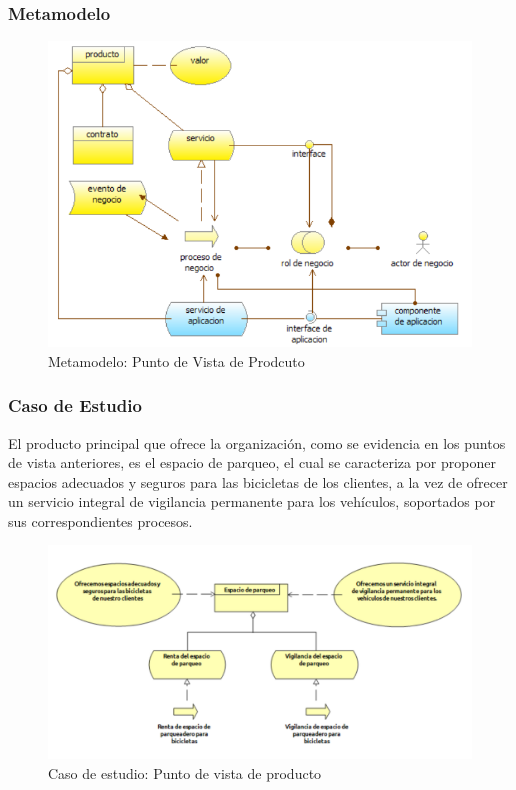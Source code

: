 \subsubsection{Metamodelo}
\begin{figure}[H]
	\centering
	\includegraphics[width=1.0\textwidth]{imagenes/Metamodelos/Negocio/meta_producto.png}
	\caption{Metamodelo: Punto de Vista de Prodcuto}
	\label{fig:gap_analysis}
\end{figure}


\subsubsection{Caso de Estudio}
El producto principal que ofrece la organización, como se evidencia en los puntos de vista anteriores, es el espacio de parqueo, el cual se caracteriza por proponer espacios adecuados y seguros para las bicicletas de los clientes, a la vez de ofrecer un servicio integral de vigilancia permanente para los vehículos, soportados por sus correspondientes procesos.
\begin{figure}[H]
	\centering
	\includegraphics[width=1.0\textwidth]{imagenes/Caso_estudio/Negocio/Producto.PDF}
	\caption{Caso de estudio: Punto de vista de producto}
	\label{fig:gap_analysis}
\end{figure}


